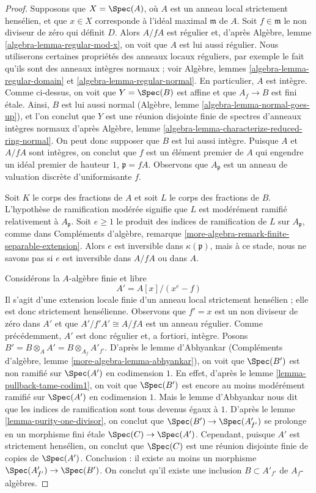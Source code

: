 \begin{proof}
\medskip\noindent
Supposons que $X = \Spec(A)$, où $A$ est un anneau local strictement hensélien,
et que $x \in X$ corresponde à l'idéal maximal $\mathfrak m$ de $A$.
Soit $f \in \mathfrak m$ le non diviseur de zéro qui définit $D$.
Alors $A/fA$ est régulier et, d'après Algèbre, lemme \ref{algebra-lemma-regular-mod-x},
on voit que $A$ est lui aussi régulier. Nous utiliserons certaines propriétés des anneaux
locaux réguliers, par exemple le fait qu'ils sont des anneaux intègres normaux ; voir
Algèbre, lemmes \ref{algebra-lemma-regular-domain} et
\ref{algebra-lemma-regular-normal}. En particulier, $A$ est intègre.
Comme ci-dessus, on voit que $Y = \Spec(B)$ est affine et que $A_f \to B$
est fini \'etale. Ainsi, $B$ est lui aussi normal
(Algèbre, lemme \ref{algebra-lemma-normal-goes-up}),
et l'on conclut que $Y$ est une réunion disjointe finie de spectres d'anneaux intègres normaux d'après
Algèbre, lemme \ref{algebra-lemma-characterize-reduced-ring-normal}.
On peut donc supposer que $B$ est lui aussi intègre.
Puisque $A$ et $A/fA$ sont intègres, on conclut que $f$ est un élément
premier de $A$ qui engendre un idéal premier de hauteur $1$, $\mathfrak p = fA$.
Observons que $A_\mathfrak p$ est un anneau de valuation discrète d'uniformisante $f$.

\medskip\noindent
Soit $K$ le corps des fractions de $A$ et soit $L$ le corps des
fractions de $B$. L'hypothèse de ramification modérée signifie que
$L$ est modérément ramifié relativement à $A_\mathfrak p$.
Soit $e \geq 1$ le produit des indices de ramification de $L$
sur $A_\mathfrak p$, comme dans
Compléments d'algèbre, remarque \ref{more-algebra-remark-finite-separable-extension}.
Alors $e$ est inversible dans $\kappa(\mathfrak p)$, mais
à ce stade, nous ne savons pas si $e$ est inversible dans $A/fA$
ou dans $A$.

\medskip\noindent
Considérons la $A$-algèbre finie et libre
$$
A' = A[x]/(x^e - f)
$$
Il s'agit d'une extension locale finie d'un anneau local
strictement hensélien ; elle est donc strictement hensélienne.
Observons que $f' = x$ est un non diviseur de zéro dans $A'$ et que
$A'/f'A' \cong A/fA$ est un anneau régulier. Comme précédemment, $A'$
est donc régulier et, a fortiori, intègre. Posons
$B' = B \otimes_A A' = B \otimes_{A_f} A'_{f'}$.
D'après le lemme d'Abhyankar
(Compléments d'algèbre, lemme \ref{more-algebra-lemma-abhyankar}),
on voit que $\Spec(B')$ est non ramifié sur $\Spec(A')$
en codimension $1$. En effet, d'après le lemme \ref{lemma-pullback-tame-codim1},
on voit que $\Spec(B')$ est encore au moins modérément ramifié
sur $\Spec(A')$ en codimension $1$. Mais le lemme d'Abhyankar
nous dit que les indices de ramification sont tous devenus égaux à $1$.
D'après le lemme \ref{lemma-purity-one-divisor}, on conclut que
$\Spec(B') \to \Spec(A'_{f'})$ se prolonge en un morphisme fini \'etale
$\Spec(C) \to \Spec(A')$. Cependant, puisque $A'$ est strictement hensélien,
on conclut que $\Spec(C)$ est une réunion disjointe finie de copies
de $\Spec(A')$. Conclusion : il existe au moins un morphisme
$\Spec(A'_{f'}) \to \Spec(B')$. On conclut qu'il existe
une inclusion $B \subset A'_{f'}$ de $A_f$-algèbres.


\end{proof}
